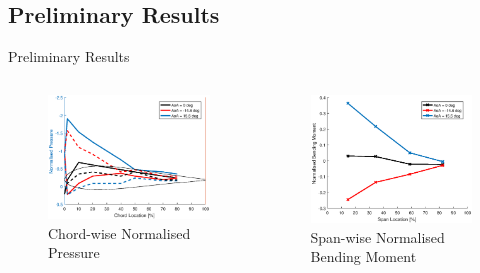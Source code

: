 \documentclass[aspectratio=169]{beamer}            %
\begin{document}
\subsection[Preliminary Results]{Preliminary Results}
\begin{frame}{Preliminary Results}

  \vspace{-1.5em}
	\begin{columns}
	  \begin{column}{0.5\textwidth}
		  \begin{figure}[!htb]
        \centering
				\includegraphics[height=0.6\textwidth]{PressureCoeffDistribution.eps}
				\caption{Chord-wise Normalised Pressure}
				\label{fig:CharSignals_Pressure}
      \end{figure}
		\end{column}
    \begin{column}{0.5\textwidth}
		  \begin{figure}[!htb]
        \centering
				\includegraphics[height=0.6\textwidth]{BendingMomentDistribution.eps}
				\caption{Span-wise Normalised Bending Moment}
				\label{fig:CharSignals_Bending}
      \end{figure}
		\end{column}
	\end{columns}

\end{frame}
\end{document}
